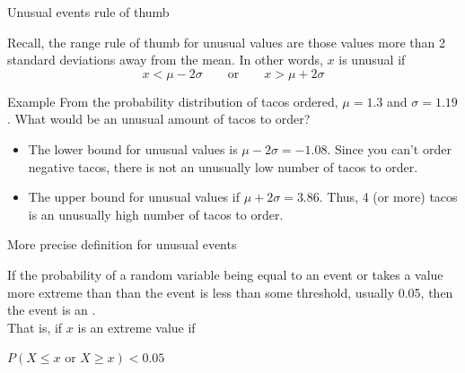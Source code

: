 \documentclass[xcolor=table, handout]{beamer}
\begin{document}
\begin{frame}{Unusual events rule of thumb}
\begin{block}{}
Recall, the range rule of thumb for unusual values are those values more than 2 standard deviations away from the mean. In other words, $x$ is unusual if
\[ x < \mu - 2\sigma \qquad \text{or} \qquad x > \mu + 2 \sigma\]
\end{block}
\pause
\begin{exampleblock}{Example}
From the probability distribution of tacos ordered, $\mu = 1.3$ and $\sigma = 1.19$. What would be an unusual amount of tacos to order?
\begin{itemize}
\pause\item The lower bound for unusual values is $\mu - 2\sigma = -1.08$. Since you can't order negative tacos, there is not an unusually low number of tacos to order.
\pause\item The upper bound for unusual values if $\mu + 2\sigma = 3.86$. Thus, 4 (or more) tacos is an unusually high number of tacos to order.
\end{itemize}
\end{exampleblock}
\end{frame}

\begin{frame}{More precise definition for unusual events}
\begin{block}{}
If the probability of a random variable being equal to an event or takes a value more extreme than than the event is less than some threshold, usually 0.05, then the event is an .\\
\medskip
\pause
That is, if $x$ is an extreme value if\\\medskip
{\centering $P(X \le x \text{ or } X \ge x) < 0.05$ \par}
\pause{}
\pause{}
\end{block}
\end{frame}
\end{document}
